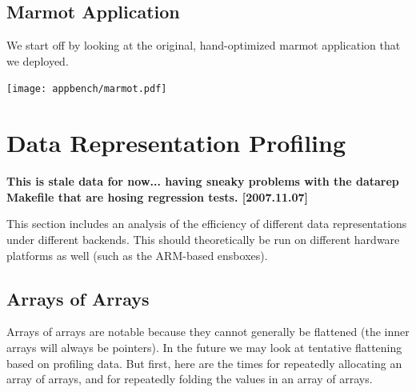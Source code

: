 \documentclass{article}
\begin{document}
\subsection{Marmot Application}

We start off by looking at the original, hand-optimized marmot
application that we deployed.

\begin{center}
\texttt{[image: appbench/marmot.pdf]}
\end{center}

\section{Data Representation Profiling}

{\bf This is stale data for now... having sneaky problems with the
datarep Makefile that are hosing regression tests. [2007.11.07]}

This section includes an analysis of the efficiency of different data
representations under different backends.  This should theoretically
be run on different hardware platforms as well (such as the ARM-based ensboxes).

\subsection{Arrays of Arrays}

Arrays of arrays are notable because they cannot generally be
flattened (the inner arrays will always be pointers).  In the future
we may look at tentative flattening based on profiling data.  But
first, here are the times for repeatedly allocating an array of
arrays, and for repeatedly folding the values in an array of arrays.
\end{document}
